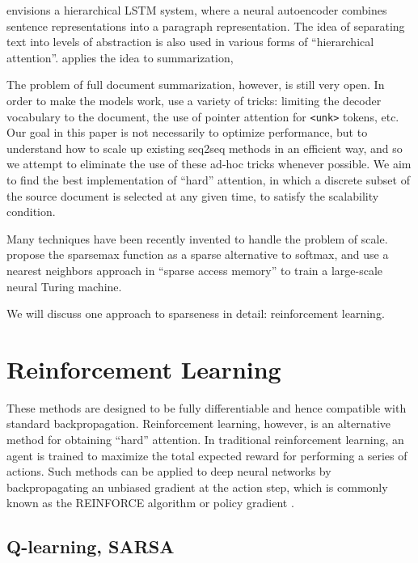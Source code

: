 \documentclass[11pt]{report}
\begin{document}
\cite{li2015autoencoder} envisions a hierarchical LSTM system, where a neural autoencoder combines sentence representations into a paragraph representation. The idea of separating text into levels of abstraction is also used in various forms of ``hierarchical attention''.
\cite{nallapati2016seq2seq} applies the idea to summarization, 


The problem of full document summarization, however, is still very open. In order to make the models work, \cite{nallapati2016seq2seq} use a variety of tricks: limiting the decoder vocabulary to the document, the use of pointer attention for \texttt{<unk>} tokens, etc. Our goal in this paper is not necessarily to optimize performance, but to understand how to scale up existing seq2seq methods in an efficient way, and so we attempt to eliminate the use of these ad-hoc tricks whenever possible. We aim to find the best implementation of ``hard'' attention, in which a discrete subset of the source document is selected at any given time, to satisfy the scalability condition.



Many techniques have been recently invented to handle the problem of scale. \cite{martins2016sparsemax} propose the sparsemax function as a sparse alternative to softmax, and \cite{rae2016sparsememory} use a nearest neighbors approach in ``sparse access memory'' to train a large-scale neural Turing machine.


We will discuss one approach to sparseness in detail: reinforcement learning.

\section{Reinforcement Learning}

These methods are designed to be fully differentiable and hence compatible with standard backpropagation. Reinforcement learning, however, is an alternative method for obtaining ``hard'' attention. In traditional reinforcement learning, an agent is trained to maximize the total expected reward for performing a series of actions. Such methods can be applied to deep neural networks by backpropagating an unbiased gradient at the action step, which is commonly known as the REINFORCE algorithm or policy gradient \citep{williams1992reinforce, schulman2015backprop}.

\subsection{Q-learning, SARSA}
\end{document}
